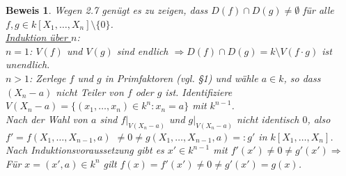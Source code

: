 \documentclass[a4paper,12pt]{report}
\theoremstyle{break}
\theoremstyle{nonumberbreak}
\theoremstyle{nonumberplain}
\newtheorem{Bew}{Beweis}
\begin{document}
\begin{Bew} Wegen 2.7 genügt es zu zeigen, dass $D(f)\cap D(g)\neq \emptyset$ für alle $f,g \in k[X_1,\dots,X_n]\setminus\{0\}$.\\
\underline{Induktion über $n$}:~\\
\underline{$n=1$}: $V(f)$ und $V(g)$ sind endlich $\Rightarrow D(f)\cap D(g)=k \setminus V(f\cdot g)$ ist unendlich.\\
\underline{$n>1$}:  Zerlege $f$ und $g$ in Primfaktoren (vgl. \S 1) und wähle $a\in k$, so dass $(X_n-a)$ nicht Teiler von $f$ oder $g$ ist. Identifiziere $V(X_n-a)= \{(x_1,\dots,x_n)\in k^n: x_n=a\}$ mit $k^{n-1}$.\\
Nach der Wahl von $a$ sind $f|_{V(X_n-a)}$ und $g|_{V(X_n-a)}$ nicht identisch $0$, also $f'=f(X_1,\dots,X_{n-1},a)$ $\neq 0 \neq g(X_1,\dots,X_{n-1},a)=:g'$ in $k[X_1,\dots,X_n]$. Nach Induktionsvoraussetzung gibt es $x'\in k^{n-1}$ mit $f'(x')\neq 0\neq g'(x')\Rightarrow$ Für $x=(x',a)\in k^n$ gilt $f(x)=f'(x')\neq 0 \neq g'(x')=g(x)$.
\end{Bew}
\end{document}
